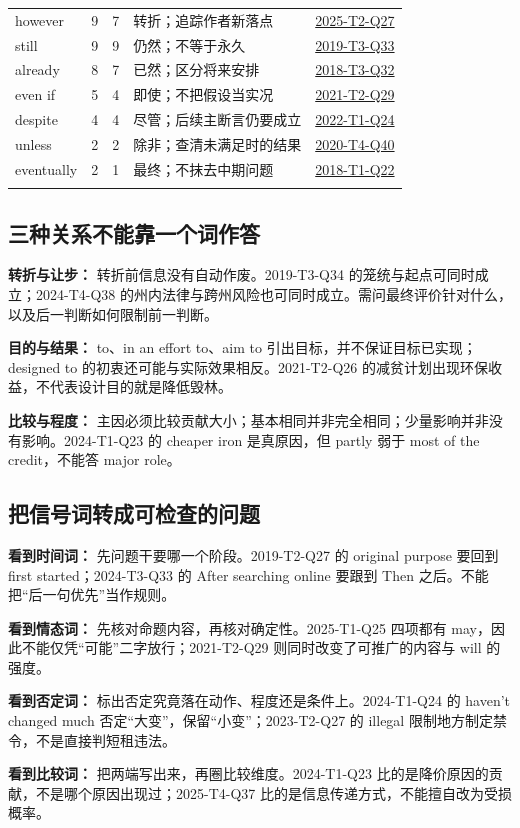 \documentclass[11pt,a4paper]{article}
\begin{document}
\begin{longtable}{@{}p{2.2cm}rrp{7.2cm}p{2.5cm}@{}}
however & 9 & 7 & 转折；追踪作者新落点 & \hyperref[idx-2025-T2-Q27]{2025-T2-Q27}\\\addlinespace[3pt]
still & 9 & 9 & 仍然；不等于永久 & \hyperref[idx-2019-T3-Q33]{2019-T3-Q33}\\\addlinespace[3pt]
already & 8 & 7 & 已然；区分将来安排 & \hyperref[idx-2018-T3-Q32]{2018-T3-Q32}\\\addlinespace[3pt]
even if & 5 & 4 & 即使；不把假设当实况 & \hyperref[idx-2021-T2-Q29]{2021-T2-Q29}\\\addlinespace[3pt]
despite & 4 & 4 & 尽管；后续主断言仍要成立 & \hyperref[idx-2022-T1-Q24]{2022-T1-Q24}\\\addlinespace[3pt]
unless & 2 & 2 & 除非；查清未满足时的结果 & \hyperref[idx-2020-T4-Q40]{2020-T4-Q40}\\\addlinespace[3pt]
eventually & 2 & 1 & 最终；不抹去中期问题 & \hyperref[idx-2018-T1-Q22]{2018-T1-Q22}\\\addlinespace[3pt]
\bottomrule\end{longtable}
\clearpage
\subsection{三种关系不能靠一个词作答}
\noindent\textbf{转折与让步：} 转折前信息没有自动作废。2019-T3-Q34 的笼统与起点可同时成立；2024-T4-Q38 的州内法律与跨州风险也可同时成立。需问最终评价针对什么，以及后一判断如何限制前一判断。\par\smallskip
\noindent\textbf{目的与结果：} to、in an effort to、aim to 引出目标，并不保证目标已实现；designed to 的初衷还可能与实际效果相反。2021-T2-Q26 的减贫计划出现环保收益，不代表设计目的就是降低毁林。\par\smallskip
\noindent\textbf{比较与程度：} 主因必须比较贡献大小；基本相同并非完全相同；少量影响并非没有影响。2024-T1-Q23 的 cheaper iron 是真原因，但 partly 弱于 most of the credit，不能答 major role。\par\smallskip
\subsection{把信号词转成可检查的问题}
\noindent\textbf{看到时间词：} 先问题干要哪一个阶段。2019-T2-Q27 的 original purpose 要回到 first started；2024-T3-Q33 的 After searching online 要跟到 Then 之后。不能把“后一句优先”当作规则。\par\smallskip
\noindent\textbf{看到情态词：} 先核对命题内容，再核对确定性。2025-T1-Q25 四项都有 may，因此不能仅凭“可能”二字放行；2021-T2-Q29 则同时改变了可推广的内容与 will 的强度。\par\smallskip
\noindent\textbf{看到否定词：} 标出否定究竟落在动作、程度还是条件上。2024-T1-Q24 的 haven’t changed much 否定“大变”，保留“小变”；2023-T2-Q27 的 illegal 限制地方制定禁令，不是直接判短租违法。\par\smallskip
\noindent\textbf{看到比较词：} 把两端写出来，再圈比较维度。2024-T1-Q23 比的是降价原因的贡献，不是哪个原因出现过；2025-T4-Q37 比的是信息传递方式，不能擅自改为受损概率。\par\smallskip
\end{document}
